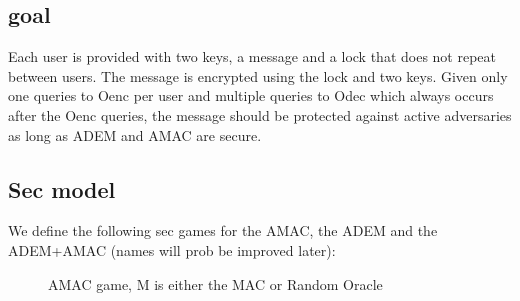 \documentclass{article}
\begin{document}
\subsection{goal}
Each user is provided with two keys, a message and a lock that does not repeat between users. The message is encrypted using the lock and two keys. Given only one queries to Oenc per user and multiple queries to Odec which always occurs after the Oenc queries, the message should be protected against active adversaries as long as ADEM and AMAC are secure.

\subsection{Sec model}
We define the following sec games for the AMAC, the ADEM and the ADEM+AMAC (names will prob be improved later):

\begin{figure}[H]
    \begin{pchstack}[boxed,center,space=0.5cm]
    \end{pchstack}
\caption{AMAC game, M is either the MAC or Random Oracle}
\end{figure}
\end{document}
